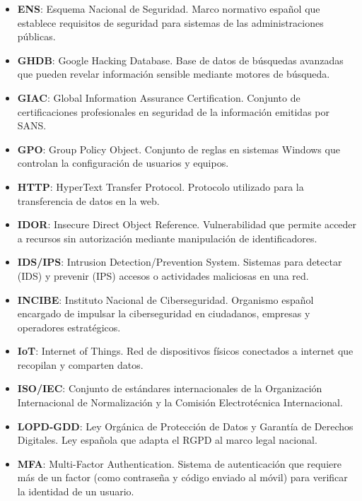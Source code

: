 \documentclass[a4paper, 11pt]{article}
\begin{document}
\begin{itemize}
    \item \textbf{ENS}: Esquema Nacional de Seguridad. Marco normativo español que establece requisitos de seguridad para sistemas de las administraciones públicas.

    \item \textbf{GHDB}: Google Hacking Database. Base de datos de búsquedas avanzadas que pueden revelar información sensible mediante motores de búsqueda.

    \item \textbf{GIAC}: Global Information Assurance Certification. Conjunto de certificaciones profesionales en seguridad de la información emitidas por SANS.

    \item \textbf{GPO}: Group Policy Object. Conjunto de reglas en sistemas Windows que controlan la configuración de usuarios y equipos.

    \item \textbf{HTTP}: HyperText Transfer Protocol. Protocolo utilizado para la transferencia de datos en la web.

    \item \textbf{IDOR}: Insecure Direct Object Reference. Vulnerabilidad que permite acceder a recursos sin autorización mediante manipulación de identificadores.

    \item \textbf{IDS/IPS}: Intrusion Detection/Prevention System. Sistemas para detectar (IDS) y prevenir (IPS) accesos o actividades maliciosas en una red.

    \item \textbf{INCIBE}: Instituto Nacional de Ciberseguridad. Organismo español encargado de impulsar la ciberseguridad en ciudadanos, empresas y operadores estratégicos.

    \item \textbf{IoT}: Internet of Things. Red de dispositivos físicos conectados a internet que recopilan y comparten datos.

    \item \textbf{ISO/IEC}: Conjunto de estándares internacionales de la Organización Internacional de Normalización y la Comisión Electrotécnica Internacional.

    \item \textbf{LOPD-GDD}: Ley Orgánica de Protección de Datos y Garantía de Derechos Digitales. Ley española que adapta el RGPD al marco legal nacional.

    \item \textbf{MFA}: Multi-Factor Authentication. Sistema de autenticación que requiere más de un factor (como contraseña y código enviado al móvil) para verificar la identidad de un usuario.


\end{itemize}
\end{document}
